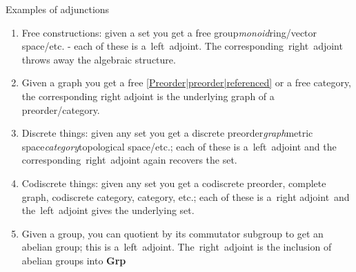 
Examples of adjunctions
\begin{enumerate}
  \item Free constructions: given a set you get a free group\emph{monoid}ring/vector space/etc. - each of these is a \,left\, adjoint. The corresponding \,right\, adjoint throws away the algebraic structure.
  \item Given a graph you get a free \ref{Preorder|preorder|referenced} or a free category, the corresponding right adjoint is the underlying graph of a preorder/category.
  \item Discrete things: given any set you get a discrete preorder\emph{graph}metric space\emph{category}topological space/etc.; each of these is a \,left\, adjoint and the corresponding \,right\, adjoint again recovers the set.
  \item Codiscrete things: given any set you get a codiscrete preorder, complete graph, codiscrete category, category, etc.; each of these is a \,right adjoint\, and the \,left\, adjoint gives the underlying set.
  \item Given a group, you can quotient by its commutator subgroup to get an abelian group; this is a \,left\, adjoint. The \,right\, adjoint is the inclusion of abelian groups into \textbf{Grp}
\end{enumerate}